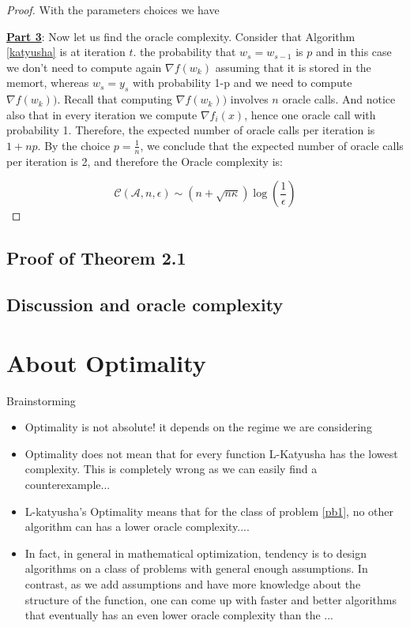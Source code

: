 \documentclass[12pt]{report}
\begin{document}
\begin{proof}
With the parameters choices we have

\textbf{\underline{Part 3}}: Now let us find the oracle complexity.
Consider that Algorithm \ref{katyusha} is at iteration $t$. the probability that $w_{s}=w_{s-1}$ is $p$ and in this case we don't need to compute again $\nabla f(w_k)$ assuming that it is stored in the memort, whereas $w_{s}=y_s$ with probability 1-p and we need to compute  $\nabla f(w_k))$. Recall that computing $\nabla f(w_k))$ involves $n$ oracle calls. And notice also that in every iteration we compute $\nabla f_i(x)$, hence one oracle call with probability 1.
Therefore, the expected number of oracle calls per iteration is $1+np$.
By the choice $p=\frac{1}{n}$, we conclude that the expected number of oracle calls per iteration is 2, and therefore the Oracle complexity is:

$$ \mathcal{C}(\mathcal{A},n,\epsilon)\sim \left(n+\sqrt{n\kappa} \right)\log\left(\frac{1}{\epsilon}\right)$$

\end{proof}

\section{Proof of Theorem 2.1}


\section{Discussion and oracle complexity}


\chapter{About Optimality}

Brainstorming
\begin{itemize}
    \item {Optimality is not absolute! it depends on the regime we are considering}
    \item Optimality does not mean that for every function L-Katyusha has the lowest complexity. This is completely wrong as we can easily find a counterexample...
    \item L-katyusha's Optimality means that for the class of problem \ref{pb1}, no other algorithm can has a lower oracle complexity....
    \item In fact, in general in mathematical optimization, tendency is to design algorithms on a class of problems with general enough assumptions. In contrast, as we add assumptions and have more knowledge about the structure of the function, one can come up with faster and better algorithms that eventually has an even lower oracle complexity than the ...
\end{itemize}
\end{document}
